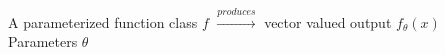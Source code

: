 \documentclass[preview]{standalone}
\begin{document}
A parameterized function class $f$ $\xrightarrow{produces}$ vector valued output $f_\theta(x)$\\Parameters $\theta$\\
\end{document}
